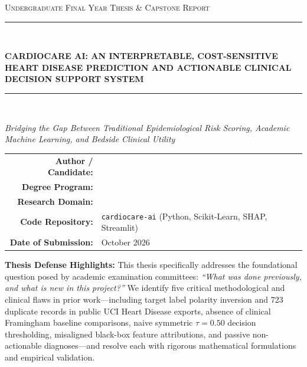 \documentclass[12pt,a4paper]{report}
\begin{document}
\begin{titlepage}
    \centering
    \vspace*{0.8cm}
    {\scshape\Large Undergraduate Final Year Thesis \& Capstone Report \par}
    \vspace{0.6cm}
    \textcolor{navyblue}{\rule{\linewidth}{1.5pt}}\\[0.4cm]
    {\huge\bfseries\textcolor{navyblue}{CARDIOCARE AI: AN INTERPRETABLE, COST-SENSITIVE HEART DISEASE PREDICTION AND ACTIONABLE CLINICAL DECISION SUPPORT SYSTEM}\par}
    \vspace{0.2cm}
    \textcolor{navyblue}{\rule{\linewidth}{1.5pt}}\\[1.0cm]

    {\Large\itshape Bridging the Gap Between Traditional Epidemiological Risk Scoring, Academic Machine Learning, and Bedside Clinical Utility\par}
    \vspace{1.6cm}

    \begin{tabular}{rl}
        \textbf{Author / Candidate:} &  \\[0.25cm]
        \textbf{Degree Program:} & \\[0.25cm]
        \textbf{Research Domain:} & \\[0.25cm]
        \textbf{Code Repository:} & \texttt{cardiocare-ai} (Python, Scikit-Learn, SHAP, Streamlit) \\[0.25cm]
        \textbf{Date of Submission:} & October 2026
    \end{tabular}

    \vfill

    \begin{minipage}{0.92\textwidth}
        \footnotesize\textcolor{slate}{
        \textbf{Thesis Defense Highlights:} This thesis specifically addresses the foundational question posed by academic examination committees: \emph{``What was done previously, and what is new in this project?''} We identify five critical methodological and clinical flaws in prior work---including target label polarity inversion and 723 duplicate records in public UCI Heart Disease exports, absence of clinical Framingham baseline comparisons, naive symmetric $\tau=0.50$ decision thresholding, misaligned black-box feature attributions, and passive non-actionable diagnoses---and resolve each with rigorous mathematical formulations and empirical validation.}
    \end{minipage}
    \vspace{0.6cm}
\end{titlepage}
\end{document}
